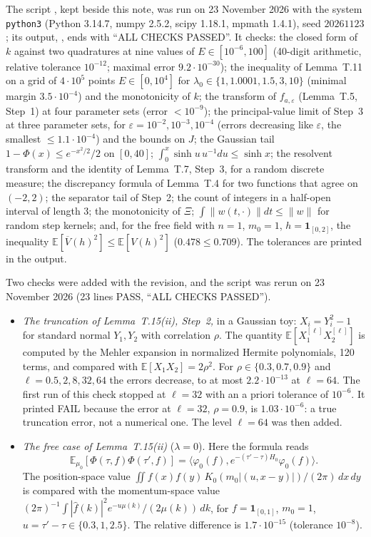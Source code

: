 \documentclass[11pt,a4paper]{article}
\newcommand{\E}{\mathbb{E}}
\newcommand{\ip}[2]{\langle #1,#2\rangle}
\newcommand{\Vb}{\overline V}                 %
\theoremstyle{plain}
\theoremstyle{definition}
\begin{document}
The script , kept beside this note, was run on 23 November 2026 with
the system \texttt{python3} (Python 3.14.7, numpy 2.5.2, scipy 1.18.1, mpmath 1.4.1), seed
$20261123$; its output, , ends with ``ALL CHECKS PASSED''.  It checks:
the closed form of $k$ against two quadratures at nine values of $E\in[10^{-6},100]$ (40-digit
arithmetic, relative tolerance $10^{-12}$; maximal error $9.2\cdot10^{-30}$); the inequality of
Lemma~T.11 on a grid of $4\cdot10^5$ points $E\in[0,10^4]$ for $\lambda_0\in\{1,1.0001,1.5,3,10\}$
(minimal margin $3.5\cdot10^{-4}$) and the monotonicity of $k$; the transform of
$f_{a,\varepsilon}$ (Lemma~T.5, Step~1) at four parameter sets (error $<10^{-9}$); the
principal-value limit of Step~3 at three parameter sets, for $\varepsilon=10^{-2},10^{-3},10^{-4}$
(errors decreasing like $\varepsilon$, the smallest $\le1.1\cdot10^{-4}$) and the bounds on $J$;
the Gaussian tail $1-\Phi(x)\le e^{-x^2/2}/2$ on $[0,40]$; $\int_0^x\sinh u\,u^{-1}du\le\sinh x$;
the resolvent transform and the identity of Lemma~T.7, Step~3, for a random discrete measure; the
discrepancy formula of Lemma~T.4 for two functions that agree on $(-2,2)$; the separator tail of
Step~2; the count of integers in a half-open interval of length $3$; the monotonicity of $\Xi$;
$\int\|w(t,\cdot)\|dt\le\|w\|$ for random step kernels; and, for the free field with $n=1$,
$m_0=1$, $h=\mathbf 1_{[0,2]}$, the inequality $\E[\Vb(h)^2]\le\E[V(h)^2]$ ($0.478\le0.709$).  The
tolerances are printed in the output.

Two checks were added with the revision, and the script was rerun on 23 November 2026 (23 lines
PASS, ``ALL CHECKS PASSED'').
\begin{itemize}
\item \emph{The truncation of Lemma~T.15(ii), Step~2,} in a Gaussian toy: $X_i=Y_i^2-1$ for
standard normal $Y_1,Y_2$ with correlation $\rho$.  The quantity $\E[X_1^{[\ell]}X_2^{[\ell]}]$
is computed by the Mehler expansion in normalized Hermite polynomials, 120 terms, and compared
with $\E[X_1X_2]=2\rho^2$.  For $\rho\in\{0.3,0.7,0.9\}$ and $\ell=0.5,2,8,32,64$ the errors
decrease, to at most $2.2\cdot10^{-13}$ at $\ell=64$.  The first run of this check stopped at
$\ell=32$ with an a priori tolerance of $10^{-6}$.  It printed FAIL because the error at
$\ell=32$, $\rho=0.9$, is $1.03\cdot10^{-6}$: a true truncation error, not a numerical one.
The level $\ell=64$ was then added.
\item \emph{The free case of Lemma~T.15(ii)} ($\lambda=0$).  Here the formula reads
\[
 \E_{\mu_0}[\Phi(\tau,f)\Phi(\tau',f)]=\ip{\varphi_0(f)}{e^{-(\tau'-\tau)H_0}\varphi_0(f)} .
\]
The
position-space value $\iint f(x)f(y)\,K_0(m_0|(u,x-y)|)/(2\pi)\,dx\,dy$ is compared with the
momentum-space value $(2\pi)^{-1}\int|\hat f(k)|^2e^{-u\mu(k)}/(2\mu(k))\,dk$, for
$f=\mathbf 1_{[0,1]}$, $m_0=1$, $u=\tau'-\tau\in\{0.3,1,2.5\}$.  The relative difference is
$1.7\cdot10^{-15}$ (tolerance $10^{-8}$).
\end{itemize}
\end{document}

